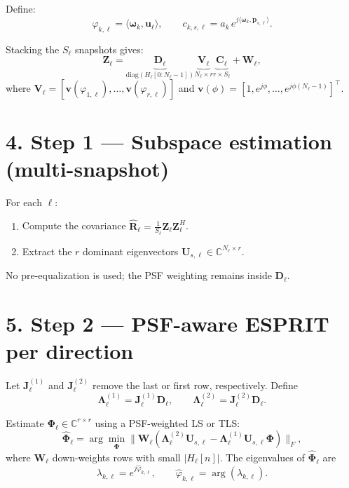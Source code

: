 \documentclass[11pt,a4paper]{article}
\begin{document}
Define:
\[
\varphi_{k,\ell} = \langle \boldsymbol{\omega}_k, \mathbf{u}_\ell\rangle, 
\qquad 
c_{k,s,\ell} = a_k\, e^{j\langle \boldsymbol{\omega}_k, \mathbf{p}_{s,\ell}\rangle}.
\]

Stacking the $S_\ell$ snapshots gives:
\begin{equation}
\mathbf{Z}_\ell = \underbrace{\mathbf{D}_\ell}_{\mathrm{diag}(H_\ell[0{:}N_\ell{-}1])}
\underbrace{\mathbf{V}_\ell}_{N_\ell \times r}
\underbrace{\mathbf{C}_\ell}_{r\times S_\ell} + \mathbf{W}_\ell,
\end{equation}
where 
$\mathbf{V}_\ell = [\mathbf{v}(\varphi_{1,\ell}),\dots,\mathbf{v}(\varphi_{r,\ell})]$ and
$\mathbf{v}(\phi) = [1, e^{j\phi}, \dots, e^{j\phi(N_\ell-1)}]^\top$.

\section*{4. Step 1 — Subspace estimation (multi-snapshot)}

For each $\ell$:
\begin{enumerate}
  \item Compute the covariance
  \(\widehat{\mathbf{R}}_\ell = \frac{1}{S_\ell}\mathbf{Z}_\ell \mathbf{Z}_\ell^H\).
  \item Extract the $r$ dominant eigenvectors 
  \(\mathbf{U}_{s,\ell} \in \mathbb{C}^{N_\ell\times r}\).
\end{enumerate}
No pre-equalization is used; the PSF weighting remains inside $\mathbf{D}_\ell$.

\section*{5. Step 2 — PSF-aware ESPRIT per direction}

Let $\mathbf{J}_\ell^{(1)}$ and $\mathbf{J}_\ell^{(2)}$ remove the last or first row, respectively.
Define
\[
\mathbf{\Lambda}_\ell^{(1)} = \mathbf{J}_\ell^{(1)}\mathbf{D}_\ell, \qquad
\mathbf{\Lambda}_\ell^{(2)} = \mathbf{J}_\ell^{(2)}\mathbf{D}_\ell.
\]

Estimate $\mathbf{\Phi}_\ell \in \mathbb{C}^{r\times r}$ using a PSF-weighted LS or TLS:
\begin{equation}
\widehat{\mathbf{\Phi}}_\ell
= \arg\min_{\mathbf{\Phi}}
\big\|\mathbf{W}_\ell(\mathbf{\Lambda}_\ell^{(2)}\mathbf{U}_{s,\ell}
- \mathbf{\Lambda}_\ell^{(1)}\mathbf{U}_{s,\ell}\mathbf{\Phi})\big\|_F,
\end{equation}
where $\mathbf{W}_\ell$ down-weights rows with small $|H_\ell[n]|$.
The eigenvalues of $\widehat{\mathbf{\Phi}}_\ell$ are
\[
\lambda_{k,\ell} = e^{j\widehat{\varphi}_{k,\ell}}, 
\qquad 
\widehat{\varphi}_{k,\ell} = \arg(\lambda_{k,\ell}).
\]
\end{document}
